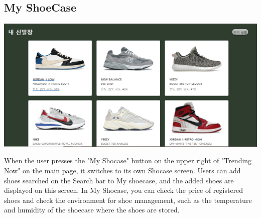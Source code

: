 \documentclass[conference]{IEEEtran}
\begin{document}
\subsection{My ShoeCase}
\centerline{\includegraphics[scale=0.23]{pics/mycase.png}}
When the user presses the "My Shocase" button on the upper right of "Trending Now" on the main page, it switches to its own Shocase screen. Users can add shoes searched on the Search bar to My shoecase, and the added shoes are displayed on this screen. In My Shocase, you can check the price of registered shoes and check the environment for shoe management, such as the temperature and humidity of the shoecase where the shoes are stored.\\\\
\end{document}
